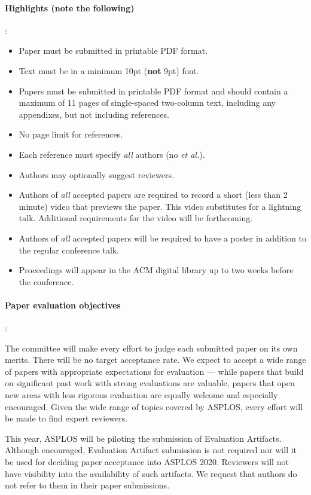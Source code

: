 \documentclass[pageno]{jpaper}
\begin{document}
\paragraph{Highlights ({\bf note the following})}:
\begin{itemize}
\item Paper must be submitted in printable PDF format.
\item Text must be in a minimum 10pt ({\bf not} 9pt) font.
\item Papers must be submitted in printable PDF format and should contain a
maximum of 11 pages of single-spaced two-column text, including any
appendixes, but not including references.
\item No page limit for references.
\item Each reference must specify {\em all} authors (no {\em et al.}).
\item Authors may optionally suggest reviewers.
\item Authors of {\em all} accepted papers are required
  to record a short (less than 2 minute) video that previews the paper.
  This video substitutes for a lightning talk.
  Additional requirements for the video will be forthcoming.
\item Authors of {\em all} accepted papers will be required to have a poster in addition to the regular
conference talk.
\item Proceedings will appear in the ACM digital library up to two weeks
before the conference.
\end{itemize}

\paragraph{Paper evaluation objectives}:

The committee will make every effort to judge each submitted paper on
its own merits. There will be no target acceptance rate.  We expect to
accept a wide range of papers with appropriate expectations for
evaluation --- while papers that build on significant past work with
strong evaluations are valuable, papers that open new areas with less
rigorous evaluation are equally welcome and especially encouraged.
Given the wide range of topics covered by ASPLOS, every effort will be
made to find expert reviewers.

This year, ASPLOS will be piloting the submission of Evaluation Artifacts. 
Although encouraged, Evaluation Artifact submission is not required nor will 
it be used for deciding paper acceptance into ASPLOS 2020. Reviewers will 
not have visibility into the availability of such artifacts. We request that 
authors do not refer to them in their paper submissions.
\end{document}
